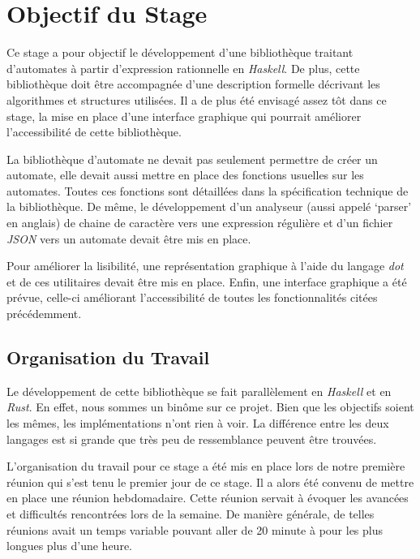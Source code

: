 \section{Objectif du Stage}

Ce stage a pour objectif le développement d'une bibliothèque traitant 
d'automates à partir d'expression rationnelle en \textit{Haskell}. De plus, 
cette bibliothèque doit être accompagnée d'une description formelle décrivant 
les algorithmes et structures utilisées. Il a de plus été envisagé 
assez tôt dans ce stage, la mise en place d'une interface graphique qui pourrait 
améliorer l'accessibilité de cette bibliothèque.

\vphantom{}

La bibliothèque d'automate ne devait pas seulement permettre de créer un 
automate, elle devait aussi mettre en place des fonctions usuelles sur les 
automates. Toutes ces fonctions sont détaillées dans la spécification technique 
de la bibliothèque. De même, le développement d'un analyseur (aussi appelé 
`parser' en anglais) de chaine de caractère vers une expression régulière et 
d'un fichier \textit{JSON} vers un automate devait être mis en place.

\vphantom{}

Pour améliorer la lisibilité, une représentation graphique à l'aide du langage 
\textit{dot} et de ces utilitaires devait être mis en place. Enfin, une 
interface graphique a été prévue, celle-ci améliorant l'accessibilité de toutes 
les fonctionnalités citées précédemment. 

\subsection{Organisation du Travail}

Le développement de cette bibliothèque se fait parallèlement en \textit{Haskell}
et en \textit{Rust}. En effet, nous sommes un binôme sur ce projet. Bien que les 
objectifs soient les mêmes, les implémentations n'ont rien à voir. La différence
entre les deux langages est si grande que très peu de ressemblance peuvent être 
trouvées.

\vphantom{}

L'organisation du travail pour ce stage a été mis en place lors de notre 
première réunion qui s'est tenu le premier jour de ce stage. Il a alors été 
convenu de mettre en place une réunion hebdomadaire. Cette réunion servait à 
évoquer les avancées et difficultés rencontrées lors de la semaine. De manière 
générale, de telles réunions avait un temps variable pouvant aller de 20 minute 
à pour les plus longues plus d'une heure.

